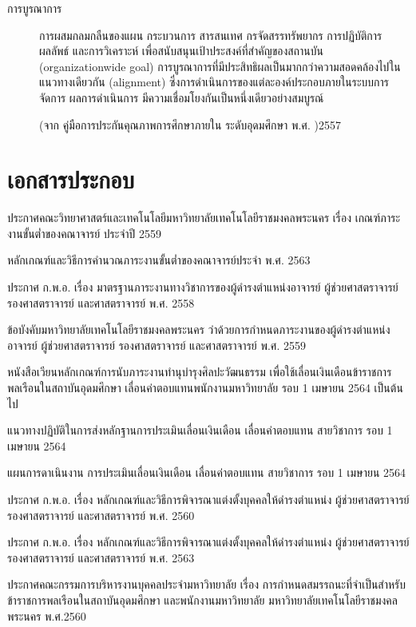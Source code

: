 \documentclass[a4paper,12pt,english]{sphinxmanual}
\begin{document}
\begin{description}
\item[{การบูรณาการ\label{\detokenize{glossary:term-11}}}] \leavevmode
การผสมกลมกลืนของแผน กระบวนการ สารสนเทศ กรจัดสรรทรัพยากร การปฏิบัติการ ผลลัพธ์ และการวิเคราะห์ เพื่อสนับสนุนเป้าประสงค์ที่สำคัญของสถานบัน (organization\sphinxhyphen{}wide goal) การบูรณาการที่มีประสิทธิผลเป็นมากกว่าความสอดคล้องไปในแนวทางเดียวกัน (alignment) ซึ่งการดำเนินการของแต่ละองค์ประกอบภายในระบบการจัดการ ผลการดำเนินการ มีความเชื่อมโยงกันเป็นหนึ่งเดียวอย่างสมบูรณ์

(จาก คู่มือการประกันคุณภาพการศึกษาภายใน ระดับอุดมศึกษา พ.ศ. )2557

\end{description}


\chapter{เอกสารประกอบ}
\label{\detokenize{official_documents:id1}}\label{\detokenize{official_documents::doc}}
 ประกาศคณะวิทยาศาสตร์และเทคโนโลยีมหาวิทยาลัยเทคโนโลยีราชมงคลพระนคร เรื่อง เกณฑ์ภาระงานขั้นต่ำของคณาจารย์ ประจำปี 2559

 หลักเกณฑ์และวิธีการคำนวณภาระงานขั้นต่ำของคณาจารย์ประจำ พ.ศ. 2563

 ประกาศ ก.พ.อ. เรื่อง มาตรฐานภาระงานทางวิชาการของผู้ดำรงตำแหน่งอาจารย์ ผู้ช่วยศาสตราจารย์ รองศาสตราจารย์ และศาสตราจารย์ พ.ศ. 2558

 ข้อบังคับมหาวิทยาลัยเทคโนโลยีราชมงคลพระนคร ว่าด้วยการกำหนดภาระงานของผู้ดำรงตำแหน่งอาจารย์ ผู้ช่วยศาสตราจารย์ รองศาสตราจารย์ และศาสตราจารย์ พ.ศ. 2559

 หนังสือเวียนหลักเกณฑ์การนับภาระงานทำนุบำรุงศิลปะวัฒนธรรม เพื่อใช้เลื่อนเงินเดือนข้าราชการพลเรือนในสถาบันอุดมศึกษา เลื่อนค่าตอบแทนพนักงานมหาวิทยาลัย รอบ 1 เมษายน 2564 เป็นต้นไป

 แนวทางปฏิบัติในการส่งหลักฐานการประเมินเลื่อนเงินเดือน เลื่อนค่าตอบแทน สายวิชาการ รอบ 1 เมษายน 2564

 แผนการดาเนินงาน การประเมินเลื่อนเงินเดือน เลื่อนค่าตอบแทน สายวิชาการ รอบ 1 เมษายน 2564

 ประกาศ ก.พ.อ. เรื่อง หลักเกณฑ์และวิธีการพิจารณาแต่งตั้งบุคคลให้ดำรงตำแหน่ง ผู้ช่วยศาสตราจารย์ รองศาสตราจารย์ และศาสตราจารย์ พ.ศ. 2560

 ประกาศ ก.พ.อ. เรื่อง หลักเกณฑ์และวิธีการพิจารณาแต่งตั้งบุคคลให้ดำรงตำแหน่ง ผู้ช่วยศาสตราจารย์ รองศาสตราจารย์ และศาสตราจารย์ พ.ศ. 2563

 ประกาศคณะกรรมการบริหารงานบุคคลประจำมหาวิทยาลัย เรื่อง การกำหนดสมรรถนะที่จำเป็นสำหรับข้าราชการพลเรือนในสถาบันอุดมศึกษา และพนักงานมหาวิทยาลัย มหาวิทยาลัยเทคโนโลยีราชมงคลพระนคร พ.ศ.2560



\renewcommand{\indexname}{Index}
\printindex
\end{document}
